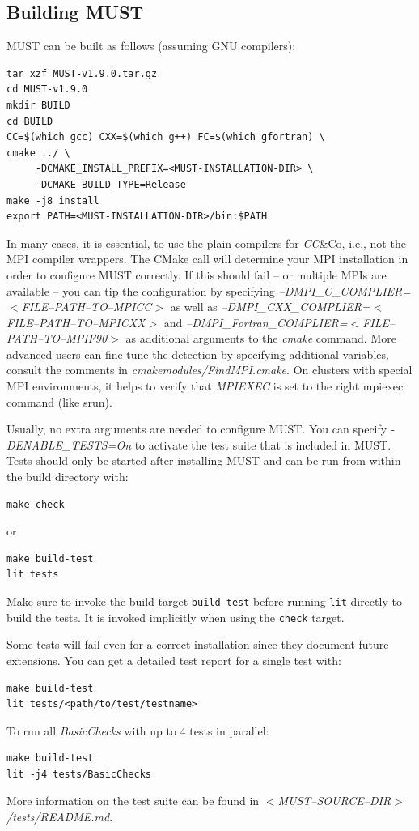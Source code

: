 \documentclass[english]{scrartcl}
\begin{document}
\subsection{Building MUST}
MUST can be built as follows (assuming GNU compilers):
\begin{verbatim}
tar xzf MUST-v1.9.0.tar.gz
cd MUST-v1.9.0
mkdir BUILD
cd BUILD
CC=$(which gcc) CXX=$(which g++) FC=$(which gfortran) \
cmake ../ \
     -DCMAKE_INSTALL_PREFIX=<MUST-INSTALLATION-DIR> \
     -DCMAKE_BUILD_TYPE=Release
make -j8 install
export PATH=<MUST-INSTALLATION-DIR>/bin:$PATH
\end{verbatim}

In many cases, it is essential, to use the plain compilers for \emph{CC}\&Co, i.e., not
the MPI compiler wrappers.
The CMake call will determine your MPI installation in order to configure
MUST correctly. If this should fail -- or multiple MPIs are available -- you
can tip the configuration by specifying
\emph{\mbox{--}DMPI\_C\_COMPLIER=$<$FILE\mbox{--}PATH\mbox{--}TO\mbox{--}MPICC$>$} as well as
\emph{\mbox{--}DMPI\_CXX\_COMPLIER=$<$FILE\mbox{--}PATH\mbox{--}TO\mbox{--}MPICXX$>$} and
\emph{\mbox{--}DMPI\_Fortran\_COMPLIER=$<$FILE\mbox{--}PATH\mbox{--}TO\mbox{--}MPIF90$>$} as additional
arguments to the \emph{cmake} command. More advanced users can fine-tune the
detection by specifying additional variables, consult the comments in
\emph{cmakemodules/FindMPI.cmake}. On clusters with special MPI environments, it helps to 
verify that \emph{MPIEXEC} is set to the right mpiexec command (like srun).

Usually, no extra arguments are needed to configure MUST. You can specify
\emph{-DENABLE\_TESTS=On} to activate the test suite that is included in MUST.
Tests should only be started after installing MUST and can be run from within the build directory with:
\begin{verbatim}
make check
\end{verbatim}
or
\begin{verbatim}
make build-test
lit tests
\end{verbatim}
Make sure to invoke the build target \texttt{build-test} before running \texttt{lit} directly to build the tests.
It is invoked implicitly when using the \texttt{check} target.

Some tests will fail even for a correct installation since they document
future extensions. You can get a detailed test report for a single test with:
\begin{verbatim}
make build-test
lit tests/<path/to/test/testname>
\end{verbatim}
To run all \emph{BasicChecks} with up to 4 tests in parallel:
\begin{verbatim}
make build-test
lit -j4 tests/BasicChecks
\end{verbatim}
More information on the test suite can be found in \emph{$<$MUST\mbox{--}SOURCE\mbox{--}DIR$>$/tests/README.md}.
\end{document}
